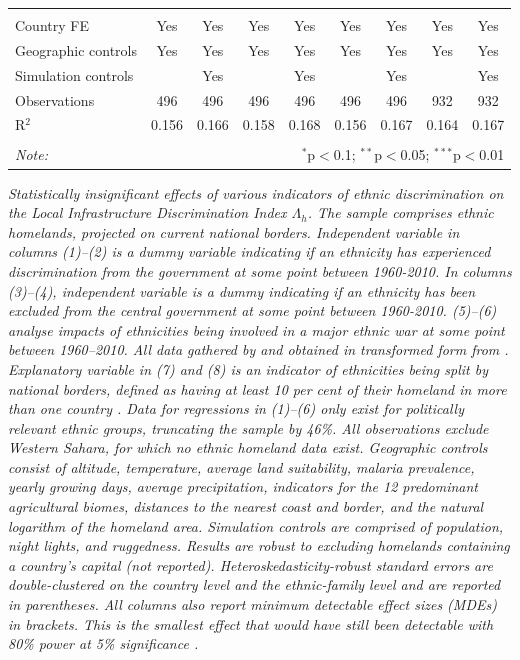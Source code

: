 \documentclass[11pt, oneside]{article}   	%
\newcommand{\mysubcaption}[1]{
\justify
\begin{spacing}{0.7}
\textit{\footnotesize #1}
\end{spacing}}
\begin{document}
\begin{table}[!ph]
{\begin{tabular}{@{\extracolsep{5pt}}lcccccccc}
    & & & & & & & & \\
  \hline \\[-1.8ex]
  Country FE & Yes & Yes & Yes & Yes & Yes & Yes & Yes & Yes \\
  Geographic controls & Yes & Yes & Yes & Yes & Yes & Yes & Yes & Yes \\
  Simulation controls &  & Yes &  & Yes &  & Yes &  & Yes \\
  Observations & 496 & 496 & 496 & 496 & 496 & 496 & 932 & 932 \\
  R$^{2}$ & 0.156 & 0.166 & 0.158 & 0.168 & 0.156 & 0.167 & 0.164 & 0.167 \\
  \hline
  \hline \\[-1.8ex]
  \textit{Note:}  & \multicolumn{8}{r}{$^{*}$p$<$0.1; $^{**}$p$<$0.05; $^{***}$p$<$0.01} \\
  \end{tabular}

}

\mysubcaption{Statistically insignificant effects of various indicators of ethnic discrimination on the Local Infrastructure Discrimination Index $\Lambda_{h}$. The sample comprises ethnic homelands, projected on current national borders. Independent variable in columns (1)--(2) is a dummy variable indicating if an ethnicity has experienced discrimination from the government at some point between 1960-2010. In columns (3)--(4), independent variable is a dummy indicating if an ethnicity has been excluded from the central government at some point between 1960-2010. (5)--(6) analyse impacts of ethnicities being involved in a major ethnic war at some point between 1960--2010. All data gathered by \cite{Vogt_IntegratingDataEthnicity_2015} and obtained in transformed form from \cite{Michalopoulos_LongRunEffectsScramble_2016}. Explanatory variable in (7) and (8) is an indicator of ethnicities being split by national borders, defined as having at least 10 per cent of their homeland in more than one country \citep[from][]{Michalopoulos_LongRunEffectsScramble_2016}. Data for regressions in  (1)--(6) only exist for politically relevant ethnic groups, truncating the sample by 46\%. All observations exclude Western Sahara, for which no ethnic homeland data exist. Geographic controls consist of altitude, temperature, average land suitability, malaria prevalence, yearly growing days, average precipitation, indicators for the 12 predominant agricultural biomes, distances to the nearest coast and border, and the natural logarithm of the homeland area.  Simulation controls are comprised of population, night lights, and ruggedness. Results are robust to excluding homelands containing a country's capital (not reported). Heteroskedasticity-robust standard errors are double-clustered on the country level and the ethnic-family level and are reported in parentheses. All columns also report minimum detectable effect sizes (MDEs) in brackets. This is the smallest effect that would have still been detectable with 80\% power at 5\% significance \citep{Haushofer_ShorttermImpactUnconditional_2016}.}
\end{table}
\end{document}
